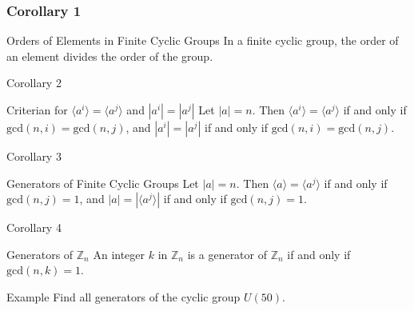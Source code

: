 \documentclass{beamer}
\begin{document}
    \begin{frame}
        \frametitle{Corollary 1}
        \begin{block}{Orders of Elements in Finite Cyclic Groups}
        In a finite cyclic group, the order of an element divides the order of the group. 
        \end{block}
    \end{frame}

    \begin{frame}{Corollary 2}
    \begin{block}{Criterian for \(\langle a^i\rangle = \langle a^j \rangle\) and \(|a^i|=|a^j|\)}   
    Let \(|a|=n\). Then \(\langle a^i \rangle = \langle a^j \rangle\) if and only if \(\text{gcd}(n,i) =\text{gcd}(n,j)\), and \(|a^i|=|a^j|\) if and only if \(\text{gcd}(n,i)=\text{gcd}(n,j)\).
    \end{block}
    \end{frame}

    \begin{frame}{Corollary 3}
    \begin{block}{Generators of Finite Cyclic Groups}
    Let \(|a|=n\). Then \(\langle a\rangle = \langle a^j\rangle\) if and only if \(\text{gcd}(n,j)=1\), and \(|a|=|\langle a^j\rangle|\) if and only if \(\text{gcd}(n,j)=1\).
    \end{block}
    \end{frame}

    \begin{frame}{Corollary 4}
    \begin{block}{Generators of \(\mathbb{Z}_n\)} 
    An integer \(k\) in \(\mathbb{Z}_n\) is a generator of \(\mathbb{Z}_n\) if and only if \(\text{gcd}(n,k)=1\).
    \end{block}
    \end{frame}

    \begin{frame}{Example}
    Find all generators of the cyclic group \(U(50)\).
    \end{frame}

    
\end{document}

